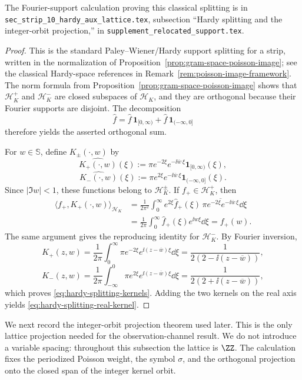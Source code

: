 \ifdefined\JFAArticleMain
The Fourier-support calculation proving this classical splitting is in
\texttt{sec\_strip\_10\_hardy\_aux\_lattice.tex}, subsection ``Hardy splitting
and the integer-orbit projection,'' in
\texttt{supplement\_relocated\_support.tex}.
\else
\begin{proof}
This is the standard Paley--Wiener/Hardy support splitting for a strip,
written in the normalization of Proposition~\ref{prop:gram-space-poisson-image};
see the classical Hardy-space references in
Remark~\ref{rem:poisson-image-framework}.
The norm formula from Proposition~\ref{prop:gram-space-poisson-image}
shows that $\mathcal H_K^+$ and $\mathcal H_K^-$ are closed subspaces of
$\mathcal H_K$, and they are orthogonal because their Fourier supports are
disjoint.  The decomposition
\[
\widehat f
=\widehat f\,\mathbf 1_{[0,\infty)}
+\widehat f\,\mathbf 1_{(-\infty,0]}
\]
therefore yields the asserted orthogonal sum.

For $w\in\mathbb S$, define $K_\pm(\cdot,w)$ by
\[
\widehat{K_+(\cdot,w)}(\xi)
:=
\pi e^{-2\xi}e^{-\ii\overline w\,\xi}\mathbf 1_{[0,\infty)}(\xi),
\]
\[
\widehat{K_-(\cdot,w)}(\xi)
:=
\pi e^{2\xi}e^{-\ii\overline w\,\xi}\mathbf 1_{(-\infty,0]}(\xi).
\]
Since $|\Im w|<1$, these functions belong to $\mathcal H_K^\pm$.  If
$f_+\in\mathcal H_K^+$, then
\begin{align*}
\langle f_+,K_+(\cdot,w)\rangle_{\mathcal H_K}
&=
\frac{1}{2\pi^2}\int_0^\infty
e^{2\xi}\widehat f_+(\xi)\,
\overline{\pi e^{-2\xi}e^{-\ii\overline w\,\xi}}\dd\xi \\
&=
\frac{1}{2\pi}\int_0^\infty \widehat f_+(\xi)e^{\ii w\xi}\dd\xi
=f_+(w).
\end{align*}
The same argument gives the reproducing identity for $\mathcal H_K^-$.  By
Fourier inversion,
\[
K_+(z,w)
=\frac{1}{2\pi}\int_0^\infty
\pi e^{-2\xi}e^{\ii(z-\overline w)\xi}\dd\xi
=\frac{1}{2(2-\ii(z-\overline w))},
\]
\[
K_-(z,w)
=\frac{1}{2\pi}\int_{-\infty}^0
\pi e^{2\xi}e^{\ii(z-\overline w)\xi}\dd\xi
=\frac{1}{2(2+\ii(z-\overline w))},
\]
which proves \eqref{eq:hardy-splitting-kernels}.  Adding the two kernels
on the real axis yields \eqref{eq:hardy-splitting-real-kernel}.
\end{proof}
\fi

We next record the integer-orbit projection theorem used later.  This is the
only lattice projection needed for the observation-channel result.  We do not
introduce a variable spacing: throughout this subsection the lattice is
\(\ZZ\).  The calculation fixes the periodized Poisson weight, the symbol
\(\sigma\), and the orthogonal projection onto the closed span of the integer
kernel orbit.

